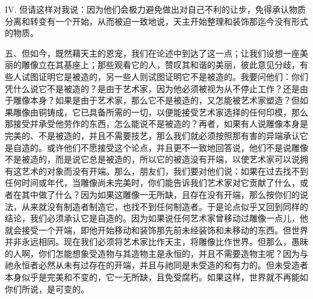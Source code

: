 IV. 但请这样对我说：因为他们会极力避免做出对自己不利的让步，免得承认物质分离和转变有一个开始，从而被迫一致地说，天主开始整理和装饰那迄今没有形式的物质。\par

五、但如今，既然藉天主的恩宠，我们在论述中到达了这一点；让我们设想一座美丽的雕像立在其基座上；那些观看它的人，赞叹其和谐的美丽，彼此意见分歧，有些人试图证明它是被造的，另一些人则试图证明它不是被造的。我要问他们：你们凭什么说它不是被造的？是由于艺术家，因为他必须被视为从不停止工作？还是由于雕像本身？如果是由于艺术家，那么它不是被造的，又怎能被艺术家塑造？但如果雕像由铜铸成，它已具备所需的一切，以便能接受艺术家选择的任何印模，那么那接受并承受他劳作的东西，怎么能说不是被造的？再者，如果有人说雕像本身是完美的、不是被造的，并且不需要技艺，那么我们就必须按照那有害的异端承认它是自造的。\newline{}或许他们不愿接受这个论点，并且更不一致地回答说，他们不是说雕像不是被造的，而是说它总是被造的，所以它的被造没有开端，以使艺术家可以说拥有这艺术的对象而没有开端。\newline{}那么，朋友们，我们要对他们说：如果在过去找不到任何时间或年代，当雕像尚未完美时，你们能告诉我们艺术家对它贡献了什么，或者在其中做了什么？因为如果这雕像一无所缺，且存在没有开端，那么按你们的说法，从来就没有制造者制造它，也找不到任何制造者。于是论点似乎又回到同样的结论，我们必须承认它是自造的。因为如果说任何艺术家曾移动过雕像一点儿，他就会接受一个开端，即他开始移动和装饰那先前未经装饰和未移动的东西。但世界并非永远相同。现在我们必须将艺术家比作天主，将雕像比作世界。但那么，愚昧的人啊，你们怎能想象受造物与其造物主是永恒的，并且不需要造物主呢？因为与祂永恒者必然从未有过存在的开端，并且与祂同是未受造的和有力的。但未受造者本身似乎是完美和不变的，它一无所缺，且免受腐朽。如果这样，世界就不再能如你们所说，是可变的。\par

